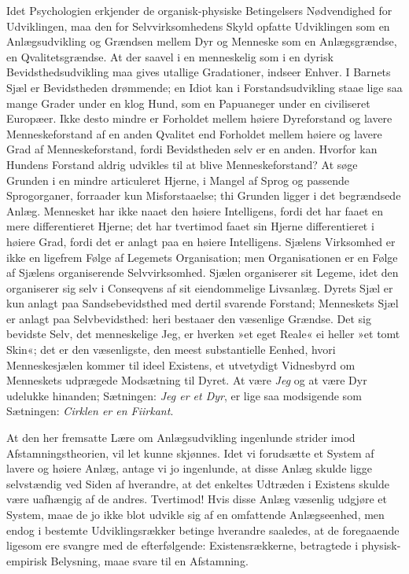 \documentclass[12pt]{book}
\newcommand{\apage}[1]{\marginnote{\footnotesize\textit{[#1]}}}
\begin{document}
\apage{208} Idet Psychologien erkjender de organisk-physiske Betingelsers Nødvendighed
for Udviklingen, maa den for Selvvirksomhedens Skyld opfatte Udviklingen
som en Anlægsudvikling og Grændsen mellem Dyr og Menneske som en
Anlægsgrændse, en Qvalitetsgrændse. At der saavel i en menneskelig som i en
dyrisk Bevidsthedsudvikling maa gives utallige Gradationer, indseer Enhver.
I Barnets Sjæl er Bevidstheden drømmende; en Idiot kan i Forstandsudvikling
staae lige saa mange Grader under en klog Hund, som en Papuaneger under en
civiliseret Europæer. Ikke desto mindre er Forholdet mellem høiere
Dyreforstand og lavere Menneskeforstand af en anden Qvalitet end Forholdet
mellem høiere og lavere Grad af Menneskeforstand, fordi Bevidstheden selv
er en anden. Hvorfor kan Hundens Forstand aldrig udvikles til at blive
Menneskeforstand? At søge Grunden i en mindre articuleret Hjerne, i Mangel
af Sprog og passende Sprogorganer, forraader kun Misforstaaelse; thi
Grunden ligger i det begrændsede Anlæg. Mennesket har ikke naaet den høiere
Intelligens, fordi det har faaet en mere differentieret Hjerne; det har
tvertimod faaet sin Hjerne differentieret i høiere Grad, fordi det er
anlagt paa en høiere Intelligens. Sjælens Virksomhed er ikke en ligefrem
Følge af Legemets Organisation; men Organisationen er en Følge af Sjælens
organiserende Selvvirksomhed. Sjælen organiserer sit Legeme, idet den
organiserer sig selv i Conseqvens af sit eiendommelige Livsanlæg. Dyrets
Sjæl er kun anlagt paa Sandsebevidsthed med dertil svarende Forstand;
Menneskets \apage{209} Sjæl er anlagt paa Selvbevidsthed: heri bestaaer den væsenlige
Grændse. Det sig bevidste Selv, det menneskelige Jeg, er hverken »et eget
Reale« ei heller »et tomt Skin«; det er den væsenligste, den meest
substantielle Eenhed, hvori Menneskesjælen kommer til ideel Existens, et
utvetydigt Vidnesbyrd om Menneskets udprægede Modsætning til Dyret. At være
\emph{Jeg} og at være Dyr udelukke hinanden; Sætningen: \emph{Jeg er et Dyr}, er lige saa
modsigende som Sætningen: \emph{Cirklen er en Fiirkant}.

At den her fremsatte Lære om Anlægsudvikling ingenlunde strider imod
Afstamningstheorien, vil let kunne skjønnes. Idet vi forudsætte et System af
lavere og høiere Anlæg, antage vi jo ingenlunde, at disse Anlæg skulde
ligge selvstændig ved Siden af hverandre, at det enkeltes Udtræden i
Existens skulde være uafhængig af de andres. Tvertimod! Hvis disse Anlæg
væsenlig udgjøre et System, maae de jo ikke blot udvikle sig af en
omfattende Anlægseenhed, men endog i bestemte Udviklingsrækker betinge
hverandre saaledes, at de foregaaende ligesom ere svangre med de
efterfølgende: Existensrækkerne, betragtede i physisk-empirisk Belysning,
maae svare til en Afstamning.
\end{document}
